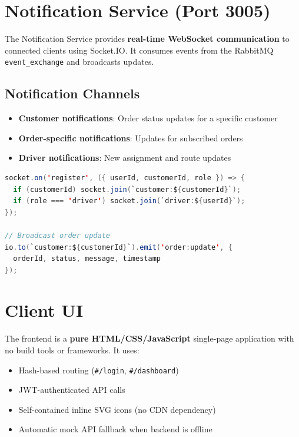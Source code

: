 \documentclass[12pt,a4paper]{article}
\begin{document}
\section{Notification Service (Port 3005)}

The Notification Service provides \textbf{real-time WebSocket communication} to connected clients using Socket.IO. It consumes events from the RabbitMQ \texttt{event\_exchange} and broadcasts updates.

\subsection{Notification Channels}

\begin{itemize}
  \item \textbf{Customer notifications}: Order status updates for a specific customer
  \item \textbf{Order-specific notifications}: Updates for subscribed orders
  \item \textbf{Driver notifications}: New assignment and route updates
\end{itemize}

\begin{lstlisting}[language=java, caption={Socket.IO Event Broadcasting}]
socket.on('register', ({ userId, customerId, role }) => {
  if (customerId) socket.join(`customer:${customerId}`);
  if (role === 'driver') socket.join(`driver:${userId}`);
});

// Broadcast order update
io.to(`customer:${customerId}`).emit('order:update', {
  orderId, status, message, timestamp
});
\end{lstlisting}

\section{Client UI}

The frontend is a \textbf{pure HTML/CSS/JavaScript} single-page application with no build tools or frameworks. It uses:

\begin{itemize}
  \item Hash-based routing (\texttt{\#/login}, \texttt{\#/dashboard})
  \item JWT-authenticated API calls
  \item Self-contained inline SVG icons (no CDN dependency)
  \item Automatic mock API fallback when backend is offline
\end{itemize}
\end{document}
